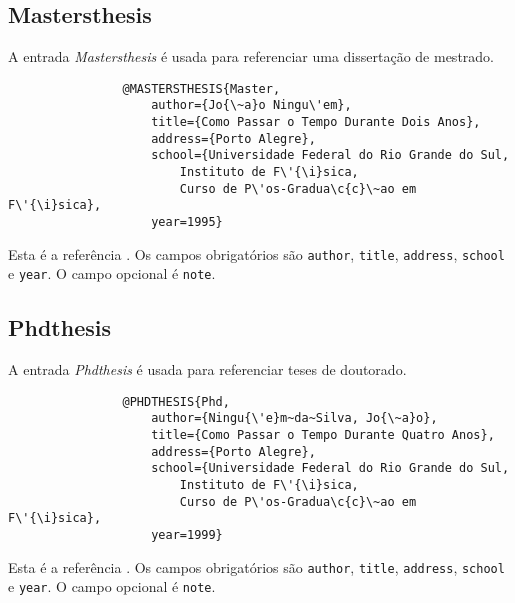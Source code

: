 \documentclass[a4paper,12pt]{article}
\newcommand{\ca}{\c{c}\~ao}
\newcommand{\enf}{\em}
\begin{document}
			
			
			\subsection*{Mastersthesis}
			
			A entrada {\enf Mastersthesis} \'e usada para referenciar uma
			disserta{\ca} de mes\-tra\-do.
			\begin{verbatim}
				@MASTERSTHESIS{Master,
					author={Jo{\~a}o Ningu\'em},
					title={Como Passar o Tempo Durante Dois Anos},
					address={Porto Alegre},
					school={Universidade Federal do Rio Grande do Sul,
						Instituto de F\'{\i}sica,
						Curso de P\'os-Gradua\c{c}\~ao em F\'{\i}sica},
					year=1995}
			\end{verbatim}
			Esta \'e a refer\^encia \cite{Master}.
			Os campos obrigat\'orios s\~ao \verb+author+,
			\verb+title+, \verb+address+, \verb+school+ e \verb+year+.
			O campo opcional \'e \verb+note+.
			
			
			\begin{comment}
				\subsection*{Misc}
				
				A entrada {\enf Misc} \'e usada para referenciar algo que n\~ao se 
				enquadre nos moldes das outras entradas.
				Sua forma geral \'e \cite{Misc}
				\begin{verbatim}
				\end{verbatim}
			\end{comment}
			
			
			
			\subsection*{Phdthesis}
			
			A entrada {\enf Phdthesis} \'e usada para referenciar teses de doutorado.
			\begin{verbatim}
				@PHDTHESIS{Phd,
					author={Ningu{\'e}m~da~Silva, Jo{\~a}o},
					title={Como Passar o Tempo Durante Quatro Anos},
					address={Porto Alegre},
					school={Universidade Federal do Rio Grande do Sul,
						Instituto de F\'{\i}sica,
						Curso de P\'os-Gradua\c{c}\~ao em F\'{\i}sica},
					year=1999}
			\end{verbatim}
			Esta \'e a refer\^encia \cite{Phd}.
			Os campos obrigat\'orios s\~ao \verb+author+,
			\verb+title+, \verb+address+, \verb+school+ e \verb+year+.
			O campo opcional \'e \verb+note+.
			
\end{document}
